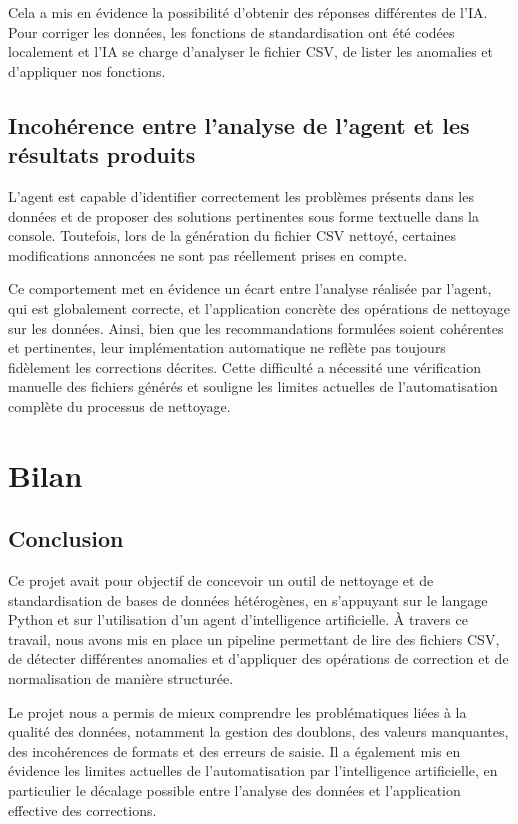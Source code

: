 \documentclass[a4paper, 12pt, twoside]{article}
\begin{document}
Cela a mis en évidence la possibilité d’obtenir des réponses différentes de l’IA. Pour corriger les données, les fonctions de standardisation ont été codées localement et l’IA se charge d’analyser le fichier CSV, de lister les anomalies et d’appliquer nos fonctions.

    \subsection{Incohérence entre l’analyse de l’agent et les résultats produits}
L’agent est capable d’identifier correctement les problèmes présents dans les données et de proposer des solutions pertinentes sous forme textuelle dans la console. Toutefois, lors de la génération du fichier CSV nettoyé, certaines modifications annoncées ne sont pas réellement prises en compte.

Ce comportement met en évidence un écart entre l’analyse réalisée par l’agent, qui est globalement correcte, et l’application concrète des opérations de nettoyage sur les données. Ainsi, bien que les recommandations formulées soient cohérentes et pertinentes, leur implémentation automatique ne reflète pas toujours fidèlement les corrections décrites. Cette difficulté a nécessité une vérification manuelle des fichiers générés et souligne les limites actuelles de l’automatisation complète du processus de nettoyage.

\newpage
\section{Bilan}
	\subsection{Conclusion}
Ce projet avait pour objectif de concevoir un outil de nettoyage et de standardisation de bases de données hétérogènes, en s’appuyant sur le langage Python et sur l’utilisation d’un agent d’intelligence artificielle. À travers ce travail, nous avons mis en place un pipeline permettant de lire des fichiers CSV, de détecter différentes anomalies et d’appliquer des opérations de correction et de normalisation de manière structurée.

Le projet nous a permis de mieux comprendre les problématiques liées à la qualité des données, notamment la gestion des doublons, des valeurs manquantes, des incohérences de formats et des erreurs de saisie. Il a également mis en évidence les limites actuelles de l’automatisation par l’intelligence artificielle, en particulier le décalage possible entre l’analyse des données et l’application effective des corrections.
\end{document}
